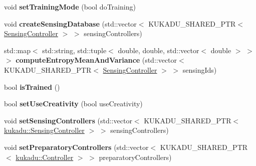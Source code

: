 \begin{DoxyCompactItemize}
\item 
void {\bfseries set\+Training\+Mode} (bool do\+Training)\hypertarget{classkukadu_1_1ComplexController_a5a0486739a34120b94901f4893fdf8d0}{}\label{classkukadu_1_1ComplexController_a5a0486739a34120b94901f4893fdf8d0}

\item 
void {\bfseries create\+Sensing\+Database} (std\+::vector$<$ K\+U\+K\+A\+D\+U\+\_\+\+S\+H\+A\+R\+E\+D\+\_\+\+P\+TR$<$ \hyperlink{classkukadu_1_1SensingController}{Sensing\+Controller} $>$ $>$ sensing\+Controllers)\hypertarget{classkukadu_1_1ComplexController_a1481c37be379f4dc717740c6f2bf74a3}{}\label{classkukadu_1_1ComplexController_a1481c37be379f4dc717740c6f2bf74a3}

\item 
std\+::map$<$ std\+::string, std\+::tuple$<$ double, double, std\+::vector$<$ double $>$ $>$ $>$ {\bfseries compute\+Entropy\+Mean\+And\+Variance} (std\+::vector$<$ K\+U\+K\+A\+D\+U\+\_\+\+S\+H\+A\+R\+E\+D\+\_\+\+P\+TR$<$ \hyperlink{classkukadu_1_1SensingController}{Sensing\+Controller} $>$ $>$ sensing\+Ids)\hypertarget{classkukadu_1_1ComplexController_aa99e9f7ca925bb717bee3f6093145ea7}{}\label{classkukadu_1_1ComplexController_aa99e9f7ca925bb717bee3f6093145ea7}

\item 
bool {\bfseries is\+Trained} ()\hypertarget{classkukadu_1_1ComplexController_a7bc07f0d165a965e1cd63be2e8c95b61}{}\label{classkukadu_1_1ComplexController_a7bc07f0d165a965e1cd63be2e8c95b61}

\item 
bool {\bfseries set\+Use\+Creativity} (bool use\+Creativity)\hypertarget{classkukadu_1_1ComplexController_aab1c99ae85030ca785a4b675ca140864}{}\label{classkukadu_1_1ComplexController_aab1c99ae85030ca785a4b675ca140864}

\item 
void {\bfseries set\+Sensing\+Controllers} (std\+::vector$<$ K\+U\+K\+A\+D\+U\+\_\+\+S\+H\+A\+R\+E\+D\+\_\+\+P\+TR$<$ \hyperlink{classkukadu_1_1SensingController}{kukadu\+::\+Sensing\+Controller} $>$ $>$ sensing\+Controllers)\hypertarget{classkukadu_1_1ComplexController_a43f98dafcffca0e3d437a3dca761ddaf}{}\label{classkukadu_1_1ComplexController_a43f98dafcffca0e3d437a3dca761ddaf}

\item 
void {\bfseries set\+Preparatory\+Controllers} (std\+::vector$<$ K\+U\+K\+A\+D\+U\+\_\+\+S\+H\+A\+R\+E\+D\+\_\+\+P\+TR$<$ \hyperlink{classkukadu_1_1Controller}{kukadu\+::\+Controller} $>$ $>$ preparatory\+Controllers)\hypertarget{classkukadu_1_1ComplexController_a3221ce22a7472721add0a585e4de12b8}{}\label{classkukadu_1_1ComplexController_a3221ce22a7472721add0a585e4de12b8}


\end{DoxyCompactItemize}
